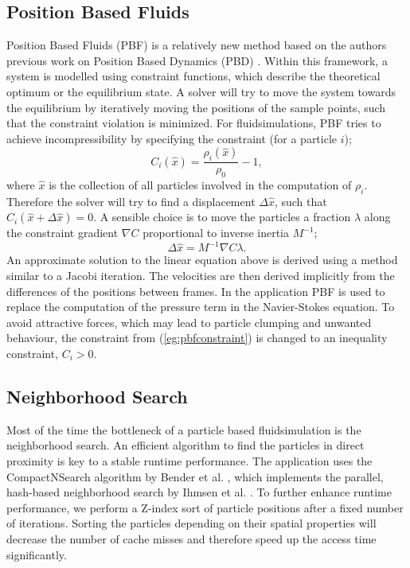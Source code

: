 \documentclass[11pt, letterpaper, twocolumn]{article}
\begin{document}
\subsection{Position Based Fluids}

Position Based Fluids (PBF) is a relatively new method based on the authors previous work on Position Based Dynamics (PBD) \cite{muller2007}.
Within this framework, a system is modelled using constraint functions, which describe the theoretical optimum or the equilibrium state. A solver will try to move the system towards the equilibrium by iteratively moving the positions of the sample points, such that the constraint violation is minimized. For fluidsimulations, PBF tries to achieve incompressibility by specifying the constraint (for a particle \(i\));
\begin{equation}
  C_i(\hat{x}) = \frac{\rho_i(\hat{x})}{\rho_0} - 1,
  \label{eg:pbfconstraint}
\end{equation}
where \(\hat{x}\) is the collection of all particles involved in the computation of \(\rho_i\). Therefore the solver will try to find a displacement \(\Delta \hat{x}\), such that \( C_i(\hat{x} + \Delta\hat{x}) = 0\). A sensible choice is to move the particles a fraction \(\lambda\) along the constraint gradient \(\nabla C\) proportional to inverse inertia \(M^{-1}\);
\begin{equation}
  \Delta\hat{x} = M^{-1} \nabla C \lambda.
  \label{eg:deltax}
\end{equation}
An approximate solution to the linear equation above is derived using a method similar to a Jacobi iteration. The velocities are then derived implicitly from the differences of the positions between frames.
In the application PBF is used to replace the computation of the pressure term in the Navier-Stokes equation. To avoid attractive forces, which may lead to particle clumping and unwanted behaviour, the constraint from (\ref{eg:pbfconstraint}) is changed to an inequality constraint, \(C_i > 0\).

\subsection{Neighborhood Search}
Most of the time the bottleneck of a particle based fluidsimulation is the neighborhood search.
An efficient algorithm to find the particles in direct proximity is key to a stable runtime performance. The application uses the CompactNSearch algorithm by Bender et al. \cite{bender2015}, which implements the parallel, hash-based neighborhood search by Ihmsen et al. \cite{ihmsen2011}. To further enhance runtime performance, we perform a Z-index sort of particle positions after a fixed number of iterations. Sorting the particles depending on their spatial properties will decrease the number of cache misses and therefore speed up the access time significantly.
\end{document}
